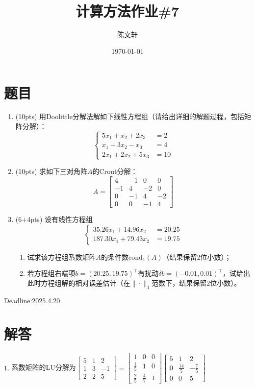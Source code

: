 \documentclass[cn,hazy,green,11pt,normal]{elegantnote}
\title{计算方法作业\#7}
\author{陈文轩}
\institute{KFRC}
\date{\today}
\begin{document}
\maketitle

\section{题目}


    \begin{enumerate}
        \item (10pts) 用Doolittle分解法解如下线性方程组（请给出详细的解题过程，包括矩阵分解）：
            \[\begin{cases}5x_1+x_2+2x_3&=2\\x_1+3x_2-x_3&=4\\2x_1+2x_2+5x_3&=10\end{cases}\]
        \item (10pts) 求如下三对角阵$A$的Crout分解：
            \[A=\begin{bmatrix}4&-1&0&0\\-1&4&-2&0\\0&-1&4&-2\\0&0&-1&4\end{bmatrix}\]
        \item (6+4pts) 设有线性方程组
            \[\begin{cases}35.26x_1+14.96x_2&=20.25\\187.30x_1+79.43x_2&=19.75\end{cases}\]
            \begin{enumerate}
                \item 试求该方程组系数矩阵$A$的条件数$\mathrm{cond}_1(A)$（结果保留2位小数）；
                \item 若方程组右端项$b=(20.25,19.75)^{\top}$有扰动$\delta b=(-0.01,0.01)^{\top}$，试给出此时方程组解的相对误差估计（在$\|\cdot\|_1$范数下，结果保留$2$位小数）。
            \end{enumerate}
    \end{enumerate}

    Deadline:2025.4.20

\section{解答}

    $1.\,\,$系数矩阵的LU分解为$\begin{bmatrix}5&1&2\\1&3&-1\\2&2&5\end{bmatrix}=\begin{bmatrix}1&0&0\\\frac15&1&0\\\frac25&\frac47&1\end{bmatrix}\begin{bmatrix}5&1&2\\0&\frac{14}5&-\frac75\\0&0&5\end{bmatrix}$
\end{document}
